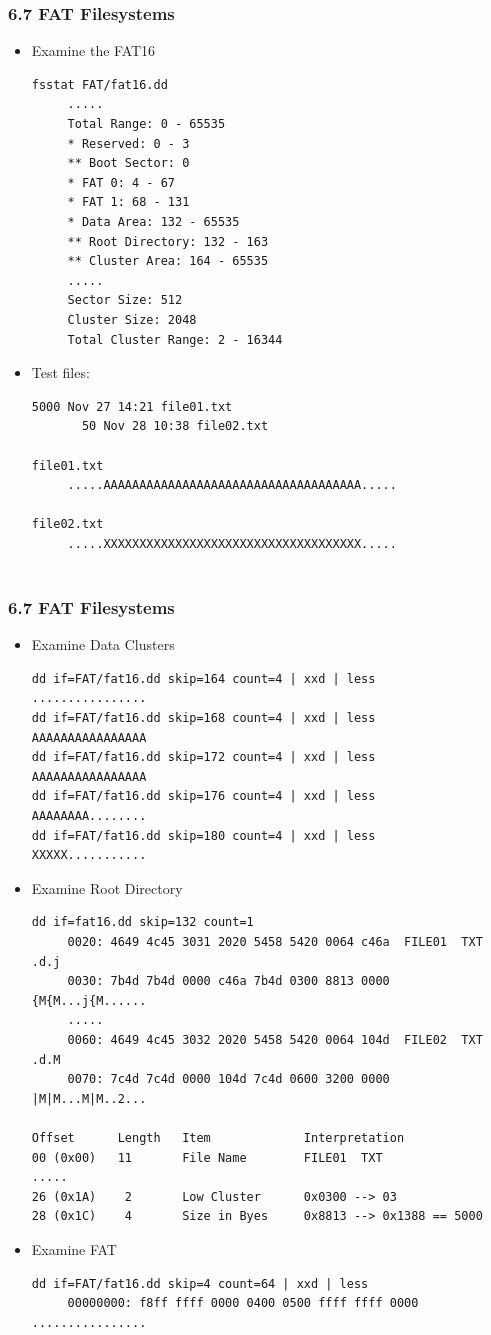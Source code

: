 \begin{frame}[fragile]
  \frametitle{6.7 FAT Filesystems}
    \begin{itemize}
	    \item Examine the FAT16
  \begin{lstlisting}[basicstyle=\tiny]
fsstat FAT/fat16.dd
     .....
     Total Range: 0 - 65535
     * Reserved: 0 - 3
     ** Boot Sector: 0
     * FAT 0: 4 - 67
     * FAT 1: 68 - 131
     * Data Area: 132 - 65535
     ** Root Directory: 132 - 163
     ** Cluster Area: 164 - 65535
     .....
     Sector Size: 512
     Cluster Size: 2048
     Total Cluster Range: 2 - 16344
  \end{lstlisting}
	    \item Test files:
  \begin{lstlisting}[basicstyle=\tiny]
     5000 Nov 27 14:21 file01.txt
       50 Nov 28 10:38 file02.txt

file01.txt
     .....AAAAAAAAAAAAAAAAAAAAAAAAAAAAAAAAAAAA.....
  
file02.txt
     .....XXXXXXXXXXXXXXXXXXXXXXXXXXXXXXXXXXXX.....
  
\end{lstlisting}
    \end{itemize}
\end{frame}


\begin{frame}[fragile]
  \frametitle{6.7 FAT Filesystems}
    \begin{itemize}
          \item Examine Data Clusters
\begin{lstlisting}[basicstyle=\tiny]
dd if=FAT/fat16.dd skip=164 count=4 | xxd | less    ................
dd if=FAT/fat16.dd skip=168 count=4 | xxd | less    AAAAAAAAAAAAAAAA
dd if=FAT/fat16.dd skip=172 count=4 | xxd | less    AAAAAAAAAAAAAAAA
dd if=FAT/fat16.dd skip=176 count=4 | xxd | less    AAAAAAAA........
dd if=FAT/fat16.dd skip=180 count=4 | xxd | less    XXXXX...........
\end{lstlisting}
	  \item Examine Root Directory
  \begin{lstlisting}[basicstyle=\tiny]
dd if=fat16.dd skip=132 count=1
     0020: 4649 4c45 3031 2020 5458 5420 0064 c46a  FILE01  TXT .d.j
     0030: 7b4d 7b4d 0000 c46a 7b4d 0300 8813 0000  {M{M...j{M......
     .....
     0060: 4649 4c45 3032 2020 5458 5420 0064 104d  FILE02  TXT .d.M
     0070: 7c4d 7c4d 0000 104d 7c4d 0600 3200 0000  |M|M...M|M..2...
  
Offset      Length   Item             Interpretation
00 (0x00)   11       File Name        FILE01  TXT
.....
26 (0x1A)    2       Low Cluster      0x0300 --> 03
28 (0x1C)    4       Size in Byes     0x8813 --> 0x1388 == 5000
  \end{lstlisting}
	  \item Examine FAT
  \begin{lstlisting}[basicstyle=\tiny]
dd if=FAT/fat16.dd skip=4 count=64 | xxd | less
     00000000: f8ff ffff 0000 0400 0500 ffff ffff 0000  ................
  \end{lstlisting}
    \end{itemize}
\end{frame}



